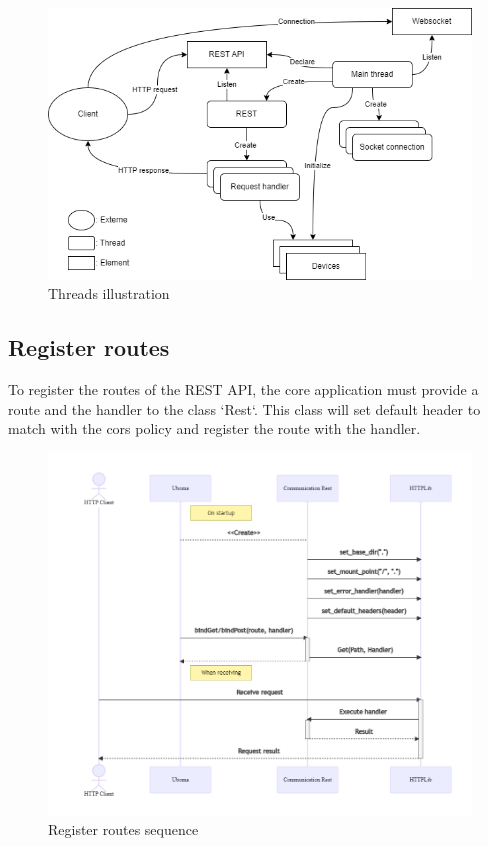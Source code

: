 \begin{figure}[ht]
  \centering
  \includegraphics[width=1\textwidth]{img/conception_threads.drawio.png}
  \caption{Threads illustration}
  \label{fig:conception:core-application:threads:illustration}
\end{figure}

\subsection{Register routes}
\label{conception:core-application:register-routes}
 To register the routes of the REST API, the core application must provide a route and the handler to the class `Rest`.
 This class will set default header to match with the \acrfull{cors} policy and register the route with the handler.

 \begin{figure}[ht]
  \centering
  \includegraphics[width=1\textwidth]{img/conception_routes.drawio.png}
  \caption{Register routes sequence}
  \label{fig:conception:core-application:register-routes:illustration}
 \end{figure}

